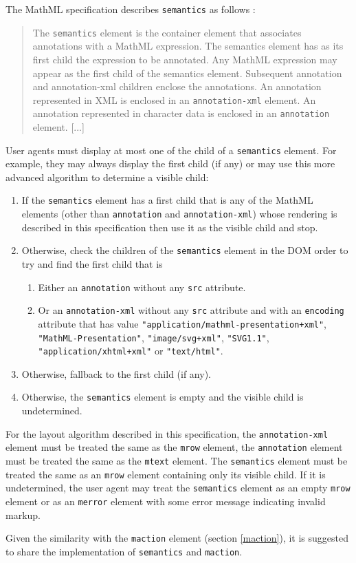 The MathML specification describes {\tt semantics} as follows \cite{MathML3}:
%
\begin{quote}
The {\tt semantics} element is the container element that associates
annotations with a MathML expression. The semantics element has as its first
child the expression to be annotated. Any MathML expression may appear as the
first child of the semantics element. Subsequent annotation and annotation-xml
children enclose the annotations. An annotation represented in XML is enclosed
in an {\tt annotation-xml} element. An annotation represented in character data
is enclosed in an {\tt annotation} element.
[...]
\end{quote}

User agents must display at most one of the child of a {\tt semantics} element.
For example, they may always display the first child (if any) or may use this
more advanced algorithm to determine a visible child:
\begin{enumerate}
\item If the {\tt semantics} element has a first child that is any of the
  MathML elements (other than {\tt annotation} and {\tt annotation-xml})
  whose rendering is described in this specification then use it as the visible
  child and stop.
\item Otherwise, check the children of the {\tt semantics} element in the DOM
  order to try and find the first child that is
  \begin{enumerate}
  \item Either an {\tt annotation} without any {\tt src} attribute.
  \item Or an {\tt annotation-xml} without any {\tt src} attribute and
    with an {\tt encoding} attribute that has value
    {\tt "application/mathml-presentation+xml"},
    {\tt "MathML-Presentation"},
    {\tt "image/svg+xml"},
    {\tt "SVG1.1"},
    {\tt "application/xhtml+xml"} or
    {\tt "text/html"}.
  \end{enumerate}
\item Otherwise, fallback to the first child (if any).
\item Otherwise, the {\tt semantics} element is empty and the visible child is
  undetermined.
\end{enumerate}

For the layout algorithm described in this specification, the
{\tt annotation-xml} element must be treated the same as the {\tt mrow} element,
the {\tt annotation} element must be treated the same as the {\tt mtext}
element. The {\tt semantics} element must be treated the same as an
{\tt mrow} element containing only its visible child. If it is undetermined,
the user agent may treat the {\tt semantics} element as an
empty {\tt mrow} element or as an {\tt merror} element with some error message
indicating invalid markup.

Given the similarity with the {\tt maction} element
(section \ref{maction}), it is
suggested to share the implementation of {\tt semantics} and {\tt maction}.
